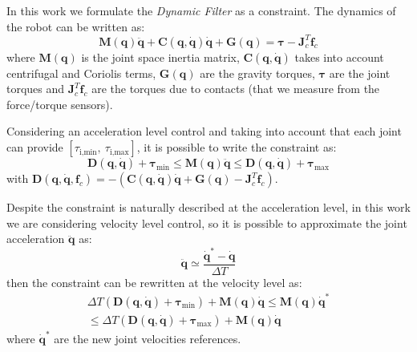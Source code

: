 In this work we formulate the \emph{Dynamic Filter} as a constraint. The dynamics of the robot can be written as:
\begin{equation}
\mathbf{M}(\mathbf{q})\mathbf{\ddot{q}} + \mathbf{C}(\mathbf{q},\mathbf{\dot{q}})\mathbf{\dot{q}} + \mathbf{G}(\mathbf{q}) = \boldsymbol{\tau} - \mathbf{J}^T_c\mathbf{f}_c
\end{equation}
where $\mathbf{M}(\mathbf{q})$ is the joint space inertia matrix, $\mathbf{C}(\mathbf{q},\mathbf{\dot{q}})$ takes into account centrifugal and Coriolis terms, $\mathbf{G}(\mathbf{q})$ are the gravity torques, $\boldsymbol{\tau}$ are the joint torques and $\mathbf{J}^T_c\mathbf{f}_c$ are the torques due to contacts (that we measure from the force/torque sensors). 

Considering an acceleration level control and taking into account that each joint can provide $\left[\tau_{\text{i,min}}, \ \tau_{\text{i,max}} \right]$, it is possible to write the constraint as:
\begin{equation}
\mathbf{D}(\mathbf{q, \dot{q}}) + \boldsymbol{\tau}_\text{min}\leq \mathbf{M}(\mathbf{q})\mathbf{\ddot{q}} \leq  \mathbf{D}(\mathbf{q, \dot{q}}) + \boldsymbol{\tau}_\text{max}
\end{equation}
with $\mathbf{D}(\mathbf{q, \dot{q}},\mathbf{f}_c) = -\left(\mathbf{C}(\mathbf{q},\mathbf{\dot{q}})\mathbf{\dot{q}} + \mathbf{G}(\mathbf{q}) - \mathbf{J}^T_c\mathbf{f}_c \right )$.

Despite the constraint is naturally described at the acceleration level, in this work we are considering velocity level control, so it is possible to approximate the joint acceleration $\mathbf{\ddot{q}}$ as:
\begin{equation}
\mathbf{\ddot{q}} \simeq \frac{\mathbf{\dot{q}}^*-\mathbf{\dot{q}}}{\Delta T}
\end{equation}
then the constraint can be rewritten at the velocity level as:
\begin{multline}
\Delta T \left(\mathbf{D}(\mathbf{q}, \mathbf{\dot{q}}) + \boldsymbol{\tau}_\text{min}\right ) + \mathbf{M}(\mathbf{q})\mathbf{\dot{q}} \leq
\mathbf{M}(\mathbf{q})\mathbf{\dot{q}}^* \\
\leq  \Delta T \left(\mathbf{D}(\mathbf{q}, \mathbf{\dot{q}}) + \boldsymbol{\tau}_\text{max}\right)+ \mathbf{M}(\mathbf{q})\mathbf{\dot{q}}
\label{robot_dynamics_constraint}
\end{multline}
where $\mathbf{\dot{q}}^*$ are the new joint velocities references.

